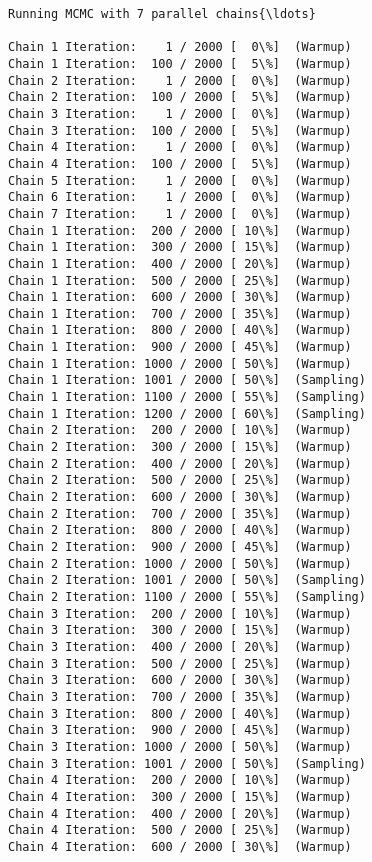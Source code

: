 \documentclass[11pt]{article}
\begin{document}
    \begin{Verbatim}[commandchars=\\\{\}]
Running MCMC with 7 parallel chains{\ldots}

Chain 1 Iteration:    1 / 2000 [  0\%]  (Warmup)
Chain 1 Iteration:  100 / 2000 [  5\%]  (Warmup)
Chain 2 Iteration:    1 / 2000 [  0\%]  (Warmup)
Chain 2 Iteration:  100 / 2000 [  5\%]  (Warmup)
Chain 3 Iteration:    1 / 2000 [  0\%]  (Warmup)
Chain 3 Iteration:  100 / 2000 [  5\%]  (Warmup)
Chain 4 Iteration:    1 / 2000 [  0\%]  (Warmup)
Chain 4 Iteration:  100 / 2000 [  5\%]  (Warmup)
Chain 5 Iteration:    1 / 2000 [  0\%]  (Warmup)
Chain 6 Iteration:    1 / 2000 [  0\%]  (Warmup)
Chain 7 Iteration:    1 / 2000 [  0\%]  (Warmup)
Chain 1 Iteration:  200 / 2000 [ 10\%]  (Warmup)
Chain 1 Iteration:  300 / 2000 [ 15\%]  (Warmup)
Chain 1 Iteration:  400 / 2000 [ 20\%]  (Warmup)
Chain 1 Iteration:  500 / 2000 [ 25\%]  (Warmup)
Chain 1 Iteration:  600 / 2000 [ 30\%]  (Warmup)
Chain 1 Iteration:  700 / 2000 [ 35\%]  (Warmup)
Chain 1 Iteration:  800 / 2000 [ 40\%]  (Warmup)
Chain 1 Iteration:  900 / 2000 [ 45\%]  (Warmup)
Chain 1 Iteration: 1000 / 2000 [ 50\%]  (Warmup)
Chain 1 Iteration: 1001 / 2000 [ 50\%]  (Sampling)
Chain 1 Iteration: 1100 / 2000 [ 55\%]  (Sampling)
Chain 1 Iteration: 1200 / 2000 [ 60\%]  (Sampling)
Chain 2 Iteration:  200 / 2000 [ 10\%]  (Warmup)
Chain 2 Iteration:  300 / 2000 [ 15\%]  (Warmup)
Chain 2 Iteration:  400 / 2000 [ 20\%]  (Warmup)
Chain 2 Iteration:  500 / 2000 [ 25\%]  (Warmup)
Chain 2 Iteration:  600 / 2000 [ 30\%]  (Warmup)
Chain 2 Iteration:  700 / 2000 [ 35\%]  (Warmup)
Chain 2 Iteration:  800 / 2000 [ 40\%]  (Warmup)
Chain 2 Iteration:  900 / 2000 [ 45\%]  (Warmup)
Chain 2 Iteration: 1000 / 2000 [ 50\%]  (Warmup)
Chain 2 Iteration: 1001 / 2000 [ 50\%]  (Sampling)
Chain 2 Iteration: 1100 / 2000 [ 55\%]  (Sampling)
Chain 3 Iteration:  200 / 2000 [ 10\%]  (Warmup)
Chain 3 Iteration:  300 / 2000 [ 15\%]  (Warmup)
Chain 3 Iteration:  400 / 2000 [ 20\%]  (Warmup)
Chain 3 Iteration:  500 / 2000 [ 25\%]  (Warmup)
Chain 3 Iteration:  600 / 2000 [ 30\%]  (Warmup)
Chain 3 Iteration:  700 / 2000 [ 35\%]  (Warmup)
Chain 3 Iteration:  800 / 2000 [ 40\%]  (Warmup)
Chain 3 Iteration:  900 / 2000 [ 45\%]  (Warmup)
Chain 3 Iteration: 1000 / 2000 [ 50\%]  (Warmup)
Chain 3 Iteration: 1001 / 2000 [ 50\%]  (Sampling)
Chain 4 Iteration:  200 / 2000 [ 10\%]  (Warmup)
Chain 4 Iteration:  300 / 2000 [ 15\%]  (Warmup)
Chain 4 Iteration:  400 / 2000 [ 20\%]  (Warmup)
Chain 4 Iteration:  500 / 2000 [ 25\%]  (Warmup)
Chain 4 Iteration:  600 / 2000 [ 30\%]  (Warmup)

\end{Verbatim}
\end{document}
